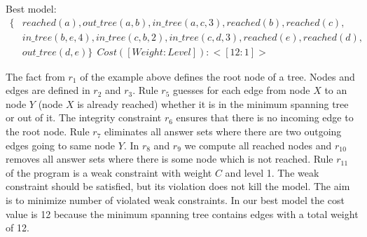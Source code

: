 \documentclass[a4paper, titlepage]{article}
\begin{document}
Best model:
\begin{align*}
\{ & \mathit{reached(a), out\_tree(a,b), 
   in\_tree(a,c,3), reached(b), reached(c),}\\ 
   & \mathit{in\_tree(b,e,4), in\_tree(c,b,2), in\_tree(c,d,3), 
   reached(e), reached(d),}\\ 
   &\mathit{  out\_tree(d,e)\}} \ \ Cost ([Weight:Level]): <[12:1]>
\end{align*}

The fact from $r_1$ of the example above defines the root node 
of a tree. Nodes and edges are defined in $r_2$ and $r_3$. 
Rule $r_5$ guesses for each edge from node 
$X$ to an node $Y$ (node $X$ is already reached) whether it is in the minimum spanning 
tree or out of it. The integrity constraint $r_6$ ensures 
that there is no incoming edge to the root node. Rule $r_7$ 
eliminates all answer sets where there are two outgoing 
edges going to same node $Y$. In $r_{8}$ and $r_{9}$ 
we compute all reached nodes and $r_{10}$ removes all answer sets where there is some node 
which is not reached. Rule $r_{11}$ of the program is a weak 
constraint with weight $C$ and level 1. The weak constraint 
should be satisfied, but its violation does not kill the 
model. The aim is to minimize number of violated weak 
constraints. In our best model the cost value is 12 because the minimum spanning tree contains edges with a total weight of 12.  
\end{document}
